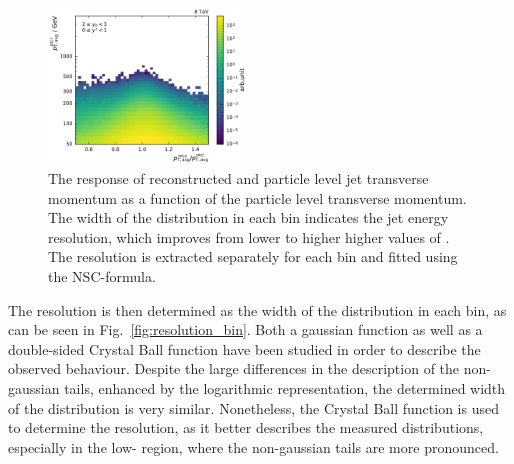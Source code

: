\begin{figure}[htbp]
    \includegraphics[width=0.47\textwidth]{figures/measurement/gen_vs_reco_vs_gen_ptavg_yb2ys0.pdf}
    \caption[Comparison generated vs. reconstructed transverse energy]
            {The response of reconstructed and particle level jet transverse
                momentum as a function of the particle level transverse momentum.
                The width of the distribution in each \ptavg bin indicates the
                jet energy resolution, which improves from lower to higher higher values of \ptavg. The
                resolution is extracted separately for each bin and
                fitted using the NSC-formula.}
    \label{fig:gen_vs_reco_over_gen}
\end{figure}

The resolution is then determined as the width of the distribution in each \ptavg
bin, as can be seen in Fig.~\ref{fig:resolution_bin}. Both a gaussian function
as well as a double-sided Crystal Ball function have been studied in order to
describe the observed behaviour. Despite the large differences in the
description of the non-gaussian tails, enhanced by the logarithmic
representation, the determined width of the distribution is very similar.
Nonetheless, the Crystal Ball function is used to determine the resolution, as
it better describes the measured distributions, especially in the low-\pt
region, where the non-gaussian tails are more pronounced.

